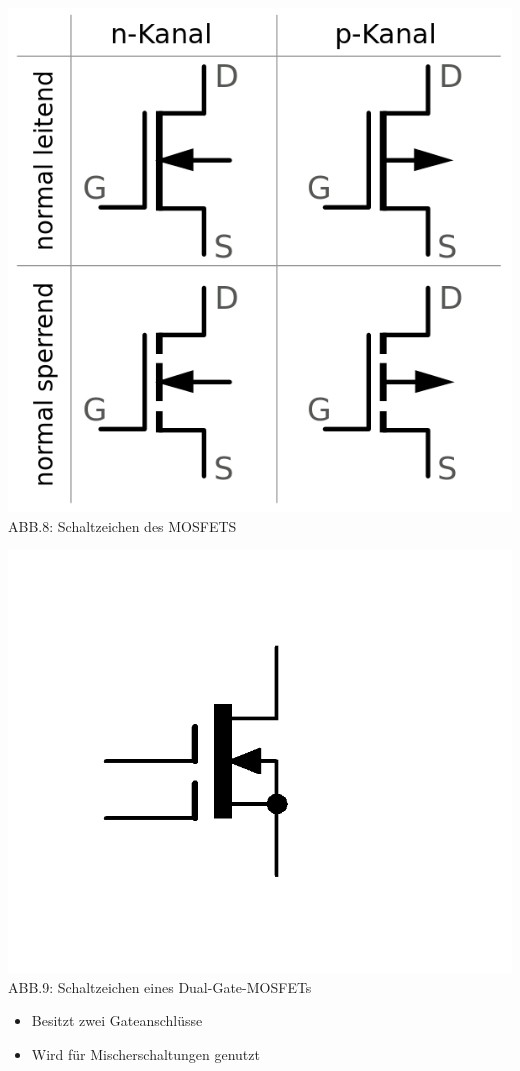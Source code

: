 \begin{frame}
	\begin{center}
		\includegraphics[scale=0.3 ]{a06/MOSFET-Symbole.png}\\
		ABB.8: Schaltzeichen des MOSFETS \cite{wmde}
	\end{center}
\end{frame}

\begin{frame}
	\begin{center}
		\includegraphics[scale=3 ]{a06/Dual-Gate-MOSFET.png}\\
		ABB.9: Schaltzeichen eines Dual-Gate-MOSFETs
	\end{center}
	\begin{itemize}
		\item	Besitzt zwei Gateanschlüsse
		\item	Wird für Mischerschaltungen genutzt
	\end{itemize}
\end{frame}

